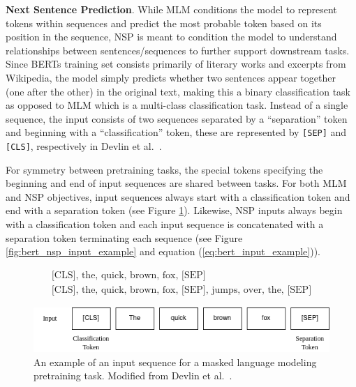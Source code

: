 \documentclass[12pt]{article}
\begin{document}
\textbf{Next Sentence Prediction}. While MLM conditions the model to represent tokens within sequences and predict the most probable token based on
its position in the sequence, NSP is meant to condition the model to understand relationships between sentences/sequences to further support
downstream tasks. Since BERTs training set consists primarily of literary works and excerpts from Wikipedia, the model simply predicts whether two
sentences appear together (one after the other) in the original text, making this a binary classification task as opposed to MLM which is a
multi-class classification task. Instead of a single sequence, the input consists of two sequences separated by a ``separation'' token and
beginning with a ``classification'' token, these are represented by \lstinline|[SEP]| and \lstinline|[CLS]|, respectively in Devlin et
al.~\cite{devlin_bert_2019}.

For symmetry between pretraining tasks, the special tokens specifying the beginning and end of input sequences are shared between tasks. For both MLM
and NSP objectives, input sequences always start with a classification token and end with a separation token (see Figure
\ref{fig:bert_mlm_input_example}). Likewise, NSP inputs always begin with a classification token and each input sequence is concatenated with a
separation token terminating each sequence (see Figure \ref{fig:bert_nsp_input_example} and equation (\ref{eq:bert_input_example})).

\begin{equation}\label{eq:bert_input_example}
    \begin{gathered}
        \mbox{[CLS], the, quick, brown, fox, [SEP]}\\
        \mbox{[CLS], the, quick, brown, fox, [SEP], jumps, over, the, [SEP]}
    \end{gathered}
\end{equation}

\begin{figure}[!t]
    \includegraphics[width=\linewidth]{figures/BERT_MLM_input.png}
    \caption{An example of an input sequence for a masked language modeling pretraining task. Modified from Devlin et al.~\cite{devlin_bert_2019}.}
    \label{fig:bert_mlm_input_example}
\end{figure}
\end{document}
